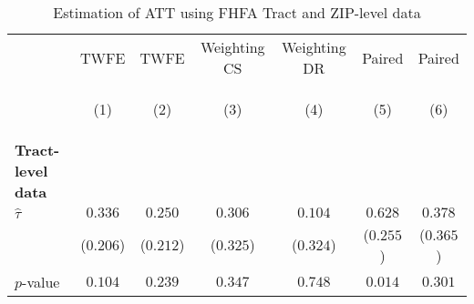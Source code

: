 
        \begin{table}[tbh]
        \caption{Estimation of ATT using FHFA Tract and ZIP-level data}
        \label{tab:tract_and_zip_lic_only_false}
        \scriptsize
        \centering
        \vspace{1em}
        \begin{threeparttable}
        \begin{tabular}{lcccccc}
\toprule
{} &                                                    TWFE &                                                   TWFE  &                                            Weighting CS &                                            Weighting DR &                                                  Paired &                                                 Paired  \\
{} & \hypertarget{tabcol:tract_and_zip_lic_only_false1}{(1)} & \hypertarget{tabcol:tract_and_zip_lic_only_false2}{(2)} & \hypertarget{tabcol:tract_and_zip_lic_only_false3}{(3)} & \hypertarget{tabcol:tract_and_zip_lic_only_false4}{(4)} & \hypertarget{tabcol:tract_and_zip_lic_only_false5}{(5)} & \hypertarget{tabcol:tract_and_zip_lic_only_false6}{(6)} \\
\midrule
\textbf{Tract-level data}        &                                                         &                                                         &                                                         &                                                         &                                                         &                                                         \\
\quad $\hat\tau$                 &                                                 $0.336$ &                                                 $0.250$ &                                                 $0.306$ &                                                 $0.104$ &                                                 $0.628$ &                                                 $0.378$ \\
\quad                            &                                               ($0.206$) &                                               ($0.212$) &                                               ($0.325$) &                                               ($0.324$) &                                               ($0.255$) &                                               ($0.365$) \\
\quad $p$-value                  &                                                 $0.104$ &                                                 $0.239$ &                                                 $0.347$ &                                                 $0.748$ &                                                 $0.014$ &                                                 $0.301$ \\

\end{tabular}
\end{threeparttable}
\end{table}
